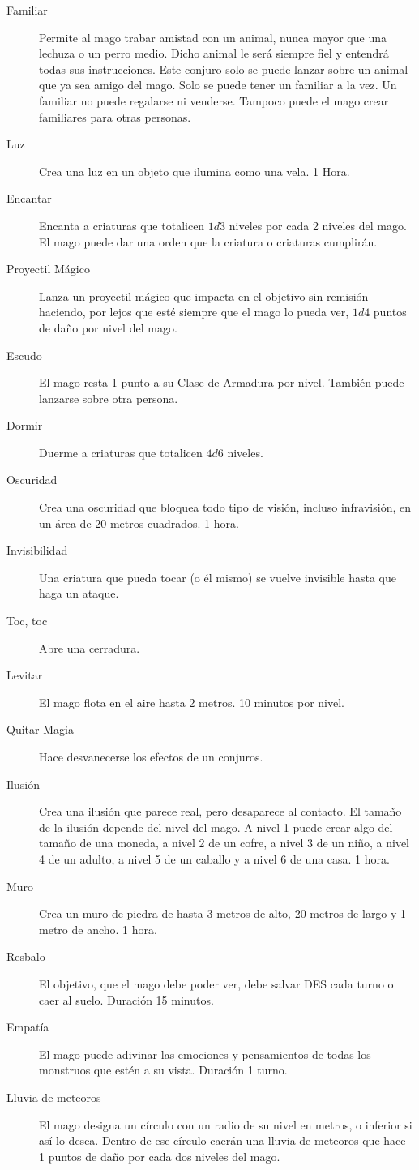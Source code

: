 \begin{multicols}{2}
\begin{description}
\item[Familiar] Permite al mago trabar amistad con un animal, nunca mayor que una lechuza o un perro medio. Dicho animal le será siempre fiel y entendrá todas sus instrucciones. Este conjuro solo se puede lanzar sobre un animal que ya sea amigo del mago. Solo se puede tener un familiar a la vez. Un familiar no puede regalarse ni venderse. Tampoco puede el mago crear familiares para otras personas.
\item[Luz] Crea una luz en un objeto que ilumina como una vela. 1 Hora.
\item[Encantar] Encanta a criaturas que totalicen $1d3$ niveles por cada 2 niveles del mago. El mago puede dar una orden que la criatura o criaturas cumplirán.
\item[Proyectil Mágico] Lanza un proyectil mágico que impacta en el objetivo sin remisión haciendo, por lejos que esté siempre que el mago lo pueda ver, $1d4$ puntos de daño por nivel del mago.
\item[Escudo] El mago resta 1 punto a su Clase de Armadura por nivel. También puede lanzarse sobre otra persona.
\item[Dormir] Duerme a criaturas que totalicen $4d6$ niveles.
\item[Oscuridad] Crea una oscuridad que bloquea todo tipo de visión, incluso infravisión, en un área de 20 metros cuadrados. 1 hora.
\item[Invisibilidad] Una criatura que pueda tocar (o él mismo) se vuelve invisible hasta que haga un ataque.
\item[Toc, toc] Abre una cerradura.
\item[Levitar] El mago flota en el aire hasta 2 metros. 10 minutos por nivel.
\item[Quitar Magia] Hace desvanecerse los efectos de un conjuros.
\item[Ilusión] Crea una ilusión que parece real, pero desaparece al contacto. El tamaño de la ilusión depende del nivel del mago. A nivel 1 puede crear algo del tamaño de una moneda, a nivel 2 de un cofre, a nivel 3 de un niño, a nivel 4 de un adulto, a nivel 5 de un caballo y a nivel 6 de una casa. 1 hora.
\item[Muro] Crea un muro de piedra de hasta 3 metros de alto, 20 metros de largo y 1 metro de ancho. 1 hora.
\item[Resbalo] El objetivo, que el mago debe poder ver, debe salvar DES cada turno o caer al suelo. Duración 15 minutos.
\item[Empatía] El mago puede adivinar las emociones y pensamientos de todas los monstruos
que estén a su vista. Duración 1 turno.
\item[Lluvia de meteoros] El mago designa un círculo con un radio de su nivel en metros, o inferior si así lo desea. Dentro de ese círculo caerán una lluvia de meteoros que hace 1 puntos de daño por cada dos niveles del mago.
\end{description}


\end{multicols}
